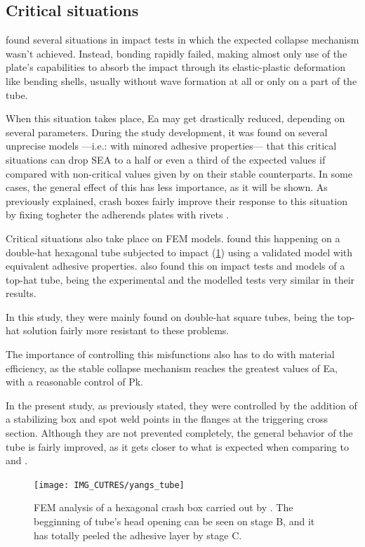 \documentclass[cmfonts]{witpress}
\begin{document}
\subsection{Critical situations}
\label{sec:critical_sits}
\cite{Peroni2009} found several situations in impact tests in which the expected collapse mechanism wasn't achieved. Instead, bonding rapidly failed, making almost only use of the plate's capabilities to absorb the impact through its elastic-plastic deformation like bending shells, usually without wave formation at all or only on a part of the tube.

When this situation takes place, Ea may get drastically reduced, depending on several parameters. During the study development, it was found on several unprecise models ---i.e.: with minored adhesive properties--- that this critical situations can drop SEA to a half or even a third of the expected values if compared with non-critical values given by \cite{Peroni2009} on their stable counterparts. In some cases, the general effect of this has less importance, as it will be shown. As previously explained, crash boxes fairly improve their response to this situation by fixing togheter the adherends plates with rivets \cite{Peroni2009}.

Critical situations also take place on FEM models. \cite{Yang2012} found this happening on a double-hat hexagonal tube subjected to impact (\cref{fig:yangs_tube}) using a validated model with equivalent adhesive properties. \cite{Yamashita2013} also found this on impact tests and models of a top-hat tube, being the experimental and the modelled tests very similar in their results.

In this study, they were mainly found on double-hat square tubes, being the top-hat solution fairly more resistant to these problems.

The importance of controlling this misfunctions also has to do with material efficiency, as the stable collapse mechanism reaches the greatest values of Ea, with a reasonable control of Pk.

In the present study, as previously stated, they were controlled by the addition of a stabilizing box and spot weld points in the flanges at the triggering cross section. Although they are not prevented completely, the general behavior of the tube is fairly improved, as it gets closer to what is expected when comparing to \cite{Peroni2009} and \cite{Scattina2011}.

\begin{figure}
	\centering
	\texttt{[image: IMG\_CUTRES/yangs\_tube]}
	\caption[FEM analysis of a hexagonal crash box carried out by \cite{Yang2012}.]{FEM analysis of a hexagonal crash box carried out by \cite{Yang2012}. The begginning of tube's head opening can be seen on stage B, and it has totally peeled the adhesive layer by stage C.}
	\label{fig:yangs_tube}
\end{figure}
\end{document}

